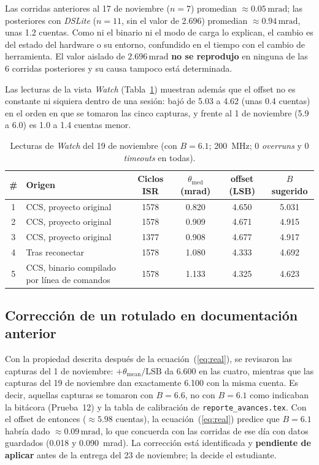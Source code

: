 \documentclass[12pt,letterpaper]{article}
\newcommand{\cod}[1]{\texttt{\detokenize{#1}}}
\newcommand{\mrad}{\,\mathrm{mrad}}
\begin{document}
Las corridas anteriores al 17 de noviembre ($n=7$) promedian $\approx 0.05\mrad$; las posteriores con \textit{DSLite} ($n=11$, sin el valor de 2.696) promedian $\approx 0.94\mrad$, unas 1.2 cuentas. Como ni el binario ni el modo de carga lo explican, el cambio es del estado del hardware o su entorno, confundido en el tiempo con el cambio de herramienta. El valor aislado de $2.696\mrad$ \textbf{no se reprodujo} en ninguna de las 6 corridas posteriores y su causa tampoco está determinada.

Las lecturas de la vista \textit{Watch} (Tabla~\ref{tab:watch}) muestran además que el offset no es constante ni siquiera dentro de una sesión: \cod{b_sugerido} bajó de 5.03 a 4.62 (unas 0.4 cuentas) en el orden en que se tomaron las cinco capturas, y frente al 1 de noviembre (5.9 a 6.0) es 1.0 a 1.4 cuentas menor.

\begin{table}[!htbp]
\centering
\caption{Lecturas de \textit{Watch} del 19 de noviembre (con $B=6.1$; 200~MHz; 0 \textit{overruns} y 0 \textit{timeouts} en todas).}
\label{tab:watch}
{\small\setlength{\tabcolsep}{4pt}\begin{tabular}{cp{4.4cm}cccc}
\toprule
\textbf{\#} & \textbf{Origen} & \textbf{Ciclos ISR} & \textbf{$\theta_{\mathrm{med}}$ (mrad)} & \textbf{offset (LSB)} & \textbf{$B$ sugerido} \\
\midrule
1 & CCS, proyecto original & 1578 & 0.820 & 4.650 & 5.031 \\
2 & CCS, proyecto original & 1578 & 0.909 & 4.671 & 4.915 \\
3 & CCS, proyecto original & 1377 & 0.908 & 4.677 & 4.917 \\
4 & Tras reconectar & 1578 & 1.080 & 4.333 & 4.692 \\
5 & CCS, binario compilado por línea de comandos & 1578 & 1.133 & 4.325 & 4.623 \\
\bottomrule
\end{tabular}}
\end{table}

\subsection{Corrección de un rotulado en documentación anterior}

Con la propiedad descrita después de la ecuación~(\ref{eq:real}), se revisaron las capturas del 1 de noviembre: \cod{b_sugerido} $+\theta_{\mathrm{mean}}/\mathrm{LSB}$ da 6.600 en las cuatro, mientras que las capturas del 19 de noviembre dan exactamente 6.100 con la misma cuenta. Es decir, aquellas capturas se tomaron con $B=6.6$, no con $B=6.1$ como indicaban la bitácora (Prueba~12) y la tabla de calibración de \texttt{reporte\_avances.tex}. Con el offset de entonces ($\approx 5.98$ cuentas), la ecuación~(\ref{eq:real}) predice que $B=6.1$ habría dado $\approx 0.09\mrad$, lo que concuerda con las corridas de ese día con datos guardados (0.018 y 0.090~mrad). La corrección está identificada y \textbf{pendiente de aplicar} antes de la entrega del 23 de noviembre; la decide el estudiante.
\end{document}
